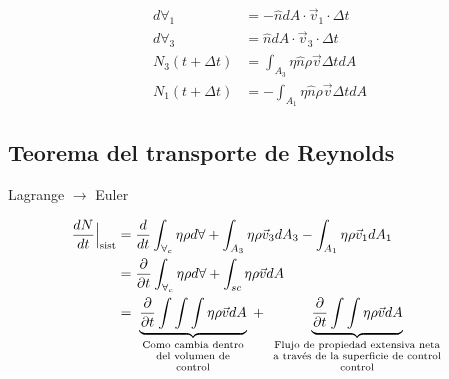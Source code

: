 
\[
    \begin{split}
        d \forall_{1} & = - \hat{n} dA \cdot \Vec{v}_{1} \cdot \Delta t \\
        d \forall_{3} & = \hat{n} dA \cdot \Vec{v}_{3} \cdot \Delta t \\
        N_{3}(t + \Delta t) & = \int_{A_{3}} \eta \hat{n} \rho \Vec{v} \Delta t dA \\
        N_{1}(t + \Delta t) & = - \int_{A_{1}} \eta \hat{n} \rho \Vec{v} \Delta t dA
    \end{split}
\]

\subsection{Teorema del transporte de Reynolds}
Lagrange \( \to \) Euler

\[
    \begin{split}
        \frac{ dN }{ dt } \Big|_{ \text{sist} } & = \frac{ d }{ dt } \int_{\forall_{c}} \eta \rho d\forall + \int_{A_{3}} \eta \rho \Vec{v}_{3} dA_{3} - \int_{A_{1}} \eta \rho \Vec{v}_{1} dA_{1} \\
        & = \frac{ \partial }{ \partial t } \int_{ \forall_{c} } \eta \rho d\forall + \int_{sc} \eta \rho \Vec{v}dA \\
        & = \underbrace{ \frac{ \partial }{ \partial t } \int \int \int \eta \rho \Vec{v} dA}_{
            \begin{scriptsize}
                    \begin{array}{cc}
                        \text{Como cambia dentro} \\
                        \text{del volumen de} \\
                        \text{control}
                    \end{array}
            \end{scriptsize}
        } + 
        \underbrace{ \frac{ \partial }{ \partial t } \int \int \eta \rho \Vec{v} dA}_{
            \begin{scriptsize}
                    \begin{array}{cc}
                        \text{Flujo de propiedad extensiva neta} \\
                        \text{a través de la superficie de control} \\
                        \text{control}
                    \end{array}
            \end{scriptsize}
        }
    \end{split}
\]

